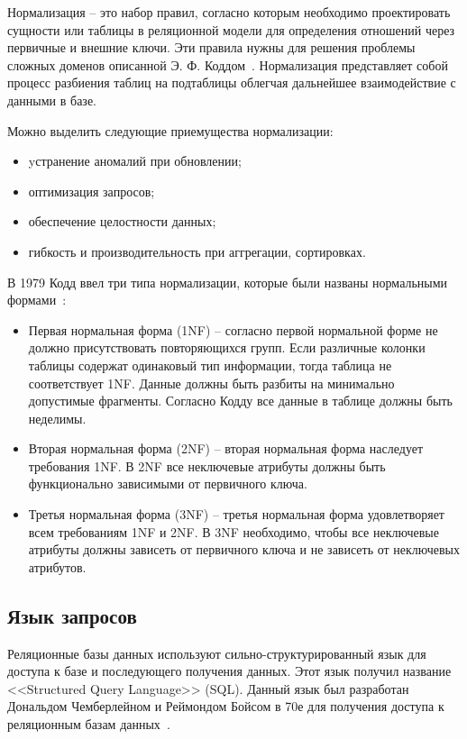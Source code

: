 Нормализация -- это набор правил, согласно которым необходимо 
проектировать сущности или таблицы в реляционной модели для определения отношений через
первичные и внешние ключи. Эти правила нужны для решения проблемы сложных доменов
описанной Э. Ф. Коддом~\cite{Codd_Relational}.
Нормализация представляет собой процесс разбиения таблиц на подтаблицы облегчая
дальнейшее взаимодействие с данными в базе.

Можно выделить следующие приемущества нормализации:
\begin{itemize}[label=---]
    \item yстранение аномалий при обновлении;
    \item оптимизация запросов;
    \item обеспечение целостности данных;  
    \item гибкость и производительность при аггрегации, сортировках.
\end{itemize}

В 1979 Кодд ввел три типа нормализации, которые были названы нормальными формами~\cite{Codd_NF}:
\begin{itemize}[label=---]

  \item Первая нормальная форма (1NF) -- согласно первой нормальной форме 
    не должно присутствовать повторяющихся групп.
    Если различные колонки таблицы содержат одинаковый тип информации,
    тогда таблица не соответствует 1NF.
    Данные должны быть разбиты на минимально допустимые фрагменты.
    Согласно Кодду все данные в таблице должны быть неделимы.
    
    \item Вторая нормальная форма (2NF) -- вторая нормальная форма наследует требования 1NF.
    В 2NF все неключевые атрибуты должны быть функционально зависимыми от первичного ключа.
    
    \item Третья нормальная форма (3NF) -- третья нормальная форма удовлетворяет всем требованиям 1NF и 2NF.
    В 3NF необходимо, чтобы все неключевые атрибуты должны зависеть от первичного ключа и не зависеть от неключевых атрибутов.

  \end{itemize}


\subsection{Язык запросов}

Реляционные базы данных используют сильно-структурированный язык для доступа к базе и последующего получения данных.
Этот язык получил название <<Structured Query Language>> (SQL).
Данный язык был разработан Дональдом Чемберлейном и Реймондом Бойсом в 70е для получения доступа к реляционным базам данных~\cite{SQL}.

